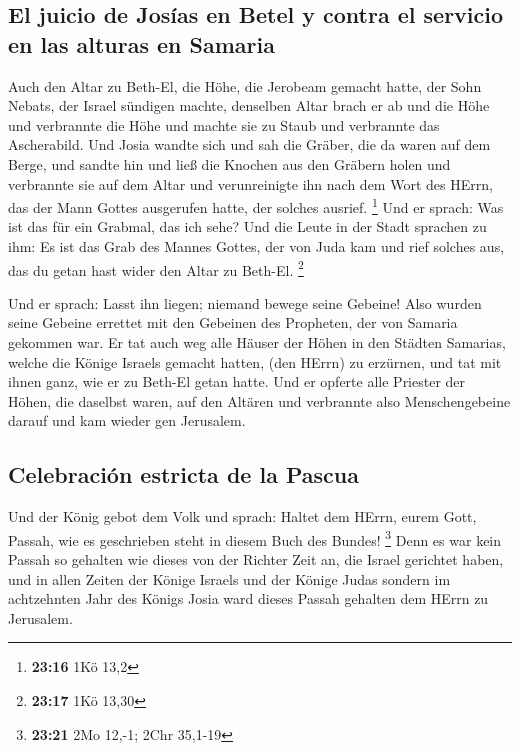 \hypertarget{el-juicio-de-josuxedas-en-betel-y-contra-el-servicio-en-las-alturas-en-samaria}{%
\subsection{El juicio de Josías en Betel y contra el servicio en las
alturas en
Samaria}\label{el-juicio-de-josuxedas-en-betel-y-contra-el-servicio-en-las-alturas-en-samaria}}

 Auch den Altar zu Beth-El, die Höhe, die Jerobeam
gemacht hatte, der Sohn Nebats, der Israel sündigen machte, denselben
Altar brach er ab und die Höhe und verbrannte die Höhe und machte sie zu
Staub und verbrannte das Ascherabild.  Und Josia wandte
sich und sah die Gräber, die da waren auf dem Berge, und sandte hin und
ließ die Knochen aus den Gräbern holen und verbrannte sie auf dem Altar
und verunreinigte ihn nach dem Wort des HErrn, das der Mann Gottes
ausgerufen hatte, der solches ausrief. \footnote{\textbf{23:16} 1Kö 13,2}
 Und er sprach: Was ist das für ein Grabmal, das ich
sehe? Und die Leute in der Stadt sprachen zu ihm: Es ist das Grab des
Mannes Gottes, der von Juda kam und rief solches aus, das du getan hast
wider den Altar zu Beth-El. \footnote{\textbf{23:17} 1Kö 13,30}

 Und er sprach: Lasst ihn liegen; niemand bewege seine
Gebeine! Also wurden seine Gebeine errettet mit den Gebeinen des
Propheten, der von Samaria gekommen war.  Er tat auch weg
alle Häuser der Höhen in den Städten Samarias, welche die Könige Israels
gemacht hatten, (den HErrn) zu erzürnen, und tat mit ihnen ganz, wie er
zu Beth-El getan hatte.  Und er opferte alle Priester der
Höhen, die daselbst waren, auf den Altären und verbrannte also
Menschengebeine darauf und kam wieder gen Jerusalem.

\hypertarget{celebraciuxf3n-estricta-de-la-pascua}{%
\subsection{Celebración estricta de la
Pascua}\label{celebraciuxf3n-estricta-de-la-pascua}}

 Und der König gebot dem Volk und sprach: Haltet dem
HErrn, eurem Gott, Passah, wie es geschrieben steht in diesem Buch des
Bundes! \footnote{\textbf{23:21} 2Mo 12,-1; 2Chr 35,1-19}
 Denn es war kein Passah so gehalten wie dieses von der
Richter Zeit an, die Israel gerichtet haben, und in allen Zeiten der
Könige Israels und der Könige Judas  sondern im
achtzehnten Jahr des Königs Josia ward dieses Passah gehalten dem HErrn
zu Jerusalem.

